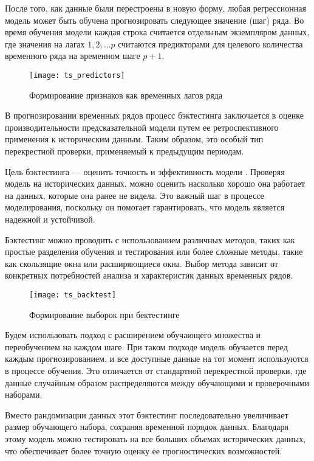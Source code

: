 После того, как данные были перестроены в новую форму, любая регрессионная модель может быть обучена прогнозировать 
следующее значение (шаг) ряда. Во время обучения модели каждая строка считается отдельным экземпляром данных, 
где значения на лагах $1, 2, \dots p$ считаются предикторами для целевого количества временного ряда на временном шаге $p+1$.

\begin{figure}[H]
	\texttt{[image: ts\_predictors]}
	\caption{Формирование признаков как временных лагов ряда}
\end{figure}

В прогнозировании временных рядов процесс бэктестинга заключается в оценке производительности предсказательной модели путем ее 
ретроспективного применения к историческим данным. Таким образом, это особый тип перекрестной проверки, применяемый к предыдущим
периодам.

Цель бэктестинга --- оценить точность и эффективность модели . 
Проверяя модель на исторических данных, можно оценить насколько хорошо она работает на данных, которые она ранее не видела. 
Это важный шаг в процессе моделирования, поскольку он помогает гарантировать, что модель является надежной и устойчивой.

Бэктестинг можно проводить с использованием различных методов, таких как простые разделения обучения и тестирования или более 
сложные методы, такие как скользящие окна или расширяющиеся окна. Выбор метода зависит от конкретных потребностей анализа и 
характеристик данных временных рядов.

\begin{figure}[H]
	\texttt{[image: ts\_backtest]}
	\caption{Формирование выборок при бектестинге}
\end{figure}

Будем использовать подход с расширением обучающего множества и переобучением на каждом шаге.
При таком подходе модель обучается перед каждым прогнозированием, и все доступные данные на тот момент используются в процессе обучения. 
Это отличается от стандартной перекрестной проверки, где данные случайным образом распределяются между обучающими и проверочными наборами.

Вместо рандомизации данных этот бэктестинг последовательно увеличивает размер обучающего набора, сохраняя временной порядок данных. 
Благодаря этому модель можно тестировать на все больших объемах исторических данных, что обеспечивает более точную оценку ее 
прогностических возможностей.

